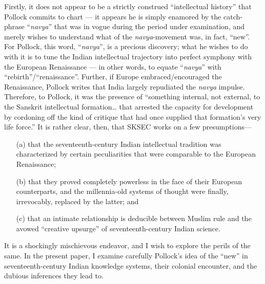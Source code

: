 Firstly, it does not appear to be a strictly construed “intellectual history” that Pollock commits to chart — it appears he is simply enamored by the catch-phrase “{\sl navya}” that was in vogue during the period under examination, and merely wishes to understand what of the {\sl navya}-movement was, in fact, “new”. For Pollock, this word, “{\sl navya}”, is a precious discovery; what he wishes to do with it is to tune the Indian intellectual trajectory into perfect symphony with the European Renaissance — in other words, to equate “{\sl navya}” with “rebirth”/“renaissance”. Further, if Europe embraced/encouraged the Renaissance, Pollock writes that India largely repudiated the {\sl navya} impulse. Therefore, to Pollock, it was the presence of “something internal, not external, to the Sanskrit intellectual formation… that arrested the capacity for development by cordoning off the kind of critique that had once supplied that formation’s very life force.”
It is rather clear, then, that SKSEC works on a few presumptions—   
\begin{itemize}
\itemsep=1pt
\item[(a)] that the seventeenth-century Indian intellectual tradition was characterized by certain peculiarities that were comparable to the European Renaissance;

\item[(b)] that they proved completely powerless in the face of their European counterparts, and the millennia-old systems of thought were finally, irrevocably, replaced by the latter; and 

\item[(c)] that an intimate relationship is deducible between Muslim rule and the avowed “creative upsurge” of seventeenth-century Indian science.
\end{itemize}

It is a shockingly mischievous endeavor, and I wish to explore the perils of the same.  In the present paper, I examine carefully Pollock’s idea of the “new” in seventeenth-century Indian knowledge systems, their colonial encounter, and the dubious inferences they lead to.\\[-20pt]

